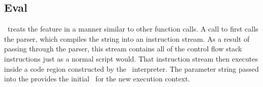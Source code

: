 \begin{comment} %
\subsection{Exceptions}
\label{sec:exceptions}
Exceptions represent a substantial challenge to information flow security, because a \code{throw} permits any called function to create an early return that crosses multiple function boundaries.
To complicate security issues further, JavaScript supports the \code{try}, \code{catch}, \code{finally} triplet of keywords.

\begin{figure}[h]
\begin{python}
code = r'''
function leak() {
  try {
    print(beg);
  } catch (ex) {
    print(ex);
  } finally {
    print(fin);
  }
}
print(debug(leak))
'''
import sys
sys.path.append('..')

import jsc
j = jsc.jsc(code)
j.run()

import bytecodeformatter
bytecodeformatter.tikz_picture(j.instructions())
\end{python}
  \caption{\FlowCore\ instruction stream representing the code snippet in \autoref{list:break-leak}.}
  \label{fig:gorn}
\end{figure}

The exception handling region of the \code{try}-block begins with a \dup instruction.
As a conservative precaution, when the interpreter encounters a \code{throw} statement, it takes care to first cloak the exception object that is to be returned to the exception handler using the current \pclabel.
Once the interpreter finds the appropriate handler, it pops all activation frames within the call chain.
Control flow then transfers to the corresponding \code{catch}-block where a \code{POPJ\_CFLABEL} instruction upgrades the entire control flow stack of the handling function using the label taken from the exception object.
Taking this action prevents implicit information leaks that might occur due to exiting the \code{try}-block early.
Such leaks are analogous to the \code{break} and \code{continue} (\autoref{sec:break-and-continue}).

The \code{finally}-block always executes using the current \pclabel, which is provided either by finishing the \code{try}-block or from catching an exception and executing the \code{catch}-block.
\end{comment}

\subsection{Eval}
\label{sec:eval}
\FlowCore\ treats the  feature in a manner similar to other function calls.
A call to  first calls the parser, which compiles the string into an instruction stream.
As a result of passing through the parser, this stream contains all of the control flow stack instructions just as a normal script would.
That instruction stream then executes inside a code region constructed by the \FlowCore\ interpreter.
The parameter string passed into the  provides the initial \pclabel\ for the new execution context.

